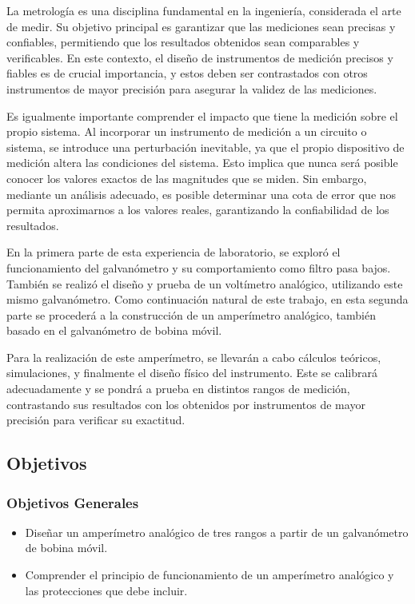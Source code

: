La metrología es una disciplina fundamental en la ingeniería, considerada el arte de medir. Su objetivo principal es garantizar que las mediciones sean precisas y confiables, permitiendo que los resultados obtenidos sean comparables y verificables. En este contexto, el diseño de instrumentos de medición precisos y fiables es de crucial importancia, y estos deben ser contrastados con otros instrumentos de mayor precisión para asegurar la validez de las mediciones.

Es igualmente importante comprender el impacto que tiene la medición sobre el propio sistema. Al incorporar un instrumento de medición a un circuito o sistema, se introduce una perturbación inevitable, ya que el propio dispositivo de medición altera las condiciones del sistema. Esto implica que nunca será posible conocer los valores exactos de las magnitudes que se miden. Sin embargo, mediante un análisis adecuado, es posible determinar una cota de error que nos permita aproximarnos a los valores reales, garantizando la confiabilidad de los resultados.

En la primera parte de esta experiencia de laboratorio, se exploró el funcionamiento del galvanómetro y su comportamiento como filtro pasa bajos. También se realizó el diseño y prueba de un voltímetro analógico, utilizando este mismo galvanómetro. Como continuación natural de este trabajo, en esta segunda parte se procederá a la construcción de un amperímetro analógico, también basado en el galvanómetro de bobina móvil.

Para la realización de este amperímetro, se llevarán a cabo cálculos teóricos, simulaciones, y finalmente el diseño físico del instrumento. Este se calibrará adecuadamente y se pondrá a prueba en distintos rangos de medición, contrastando sus resultados con los obtenidos por instrumentos de mayor precisión para verificar su exactitud.

\subsection{Objetivos}
\subsubsection*{Objetivos Generales}
\begin{itemize}
    \item Diseñar un amperímetro analógico de tres rangos a partir de un galvanómetro de bobina móvil.
    \item Comprender el principio de funcionamiento de un amperímetro analógico y las protecciones que debe incluir. 
\end{itemize}

